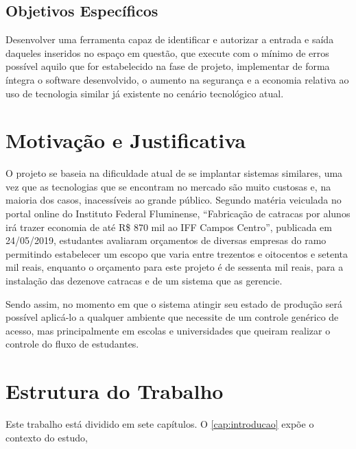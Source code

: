 \subsection{Objetivos Específicos}
Desenvolver uma ferramenta capaz de identificar e autorizar a entrada e saída daqueles
inseridos no espaço em questão, que execute com o mínimo de erros possível aquilo que for estabelecido na fase de projeto, implementar de
forma íntegra o software desenvolvido, o aumento na segurança e a economia relativa ao uso de tecnologia similar já existente
no cenário tecnológico atual.

\section{Motivação e Justificativa}

O projeto se baseia na dificuldade atual de se implantar sistemas similares,
uma vez que as tecnologias que se encontram no mercado são muito custosas e,
na maioria dos casos, inacessíveis ao grande público. Segundo matéria veiculada
no portal online do Instituto Federal Fluminense, “Fabricação de catracas por
alunos irá trazer economia de até R\$ 870 mil ao IFF Campos Centro”, publicada
em 24/05/2019, estudantes avaliaram orçamentos de diversas empresas do ramo permitindo
estabelecer um escopo que varia entre trezentos e oitocentos e setenta mil reais,
enquanto o orçamento para este projeto é de sessenta mil reais, para a instalação
das dezenove catracas e de um sistema que as gerencie.


Sendo assim, no momento em que o sistema atingir seu estado de produção será possível
aplicá-lo a qualquer ambiente que necessite de um controle genérico de acesso, mas
principalmente em escolas e universidades que queiram realizar o
controle do fluxo de estudantes.


\section{Estrutura do Trabalho}
Este trabalho está dividido em sete capítulos.
O \autoref{cap:introducao} expõe o contexto do estudo,
